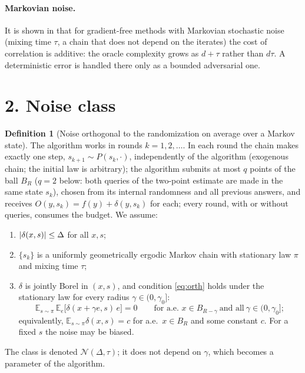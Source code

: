 \documentclass[10pt,a4paper]{article}
\newcommand{\E}{\mathbb E}\newcommand{\R}{\mathbb R}
\theoremstyle{definition}\newtheorem{definition}{Definition}
\begin{document}
\paragraph{Markovian noise.} It is shown in \cite{prokhorov} that for gradient-free methods with Markovian stochastic noise (mixing time $\tau$, a chain that does not depend on the iterates) the cost of correlation is additive: the oracle complexity grows as $d+\tau$ rather than $d\tau$. A deterministic error is handled there only as a bounded adversarial one.

\section*{2. Noise class}
\begin{definition}[Noise orthogonal to the randomization on average over a Markov state]
The algorithm works in rounds $k=1,2,\dots$. In each round the chain makes exactly one step, $s_{k+1}\sim P(s_k,\cdot)$, independently of the algorithm (exogenous chain; the initial law is arbitrary); the algorithm submits at most $q$ points of the ball $B_R$ ($q=2$ below: both queries of the two-point estimate are made in the same state $s_k$), chosen from its internal randomness and all previous answers, and receives $O(y,s_k)=f(y)+\delta(y,s_k)$ for each; every round, with or without queries, consumes the budget. We assume:
\begin{enumerate}[label=(\roman*)]
\item $\lvert \delta(x,s)\rvert\le\Delta$ for all $x,s$;
\item $\{s_k\}$ is a uniformly geometrically ergodic Markov chain with stationary law $\pi$ and mixing time $\tau$;
\item $\delta$ is jointly Borel in $(x,s)$, and condition \eqref{eq:orth} holds under the stationary law for every radius $\gamma\in(0,\gamma_0]$:
\begin{equation}\label{eq:orth-pi}
\E_{s\sim\pi}\,\E_e\big[\delta(x+\gamma e,s)\,e\big]=0\qquad\text{for a.e.\ } x\in B_{R-\gamma}\ \text{and all}\ \gamma\in(0,\gamma_0];
\end{equation}
equivalently, $\E_{s\sim\pi}\delta(x,s)=c$ for a.e.\ $x\in B_R$ and some constant $c$. For a fixed $s$ the noise may be biased.
\end{enumerate}
The class is denoted $\mathcal N(\Delta,\tau)$; it does not depend on $\gamma$, which becomes a parameter of the algorithm.


\end{definition}
\end{document}
